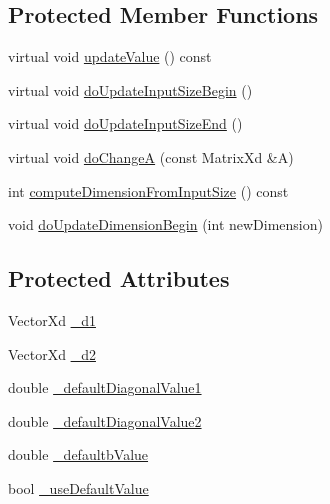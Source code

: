 \subsection*{Protected Member Functions}
\begin{DoxyCompactItemize}
\item 
virtual void \hyperlink{classocra_1_1DoubleDiagonalLinearFunction_a8c400479c04feef1c0b690791f94aff1}{update\+Value} () const 
\item 
virtual void \hyperlink{classocra_1_1DoubleDiagonalLinearFunction_a91fd529bf34bffd327fcd545035bec67}{do\+Update\+Input\+Size\+Begin} ()
\item 
virtual void \hyperlink{classocra_1_1DoubleDiagonalLinearFunction_a89070f8f2b068d8b6b3e216433e50538}{do\+Update\+Input\+Size\+End} ()
\item 
virtual void \hyperlink{classocra_1_1DoubleDiagonalLinearFunction_a55bd813c1f86402eea01bb403c6257bb}{do\+ChangeA} (const Matrix\+Xd \&A)
\item 
int \hyperlink{classocra_1_1DoubleDiagonalLinearFunction_a80f63b937bc48090d02dcb4147870820}{compute\+Dimension\+From\+Input\+Size} () const 
\item 
void \hyperlink{classocra_1_1DoubleDiagonalLinearFunction_af834599e9b414f8778e0618efc552661}{do\+Update\+Dimension\+Begin} (int new\+Dimension)
\end{DoxyCompactItemize}
\subsection*{Protected Attributes}
\begin{DoxyCompactItemize}
\item 
Vector\+Xd \hyperlink{classocra_1_1DoubleDiagonalLinearFunction_aff7e6eb0c3c53e0799909ab76d279d0a}{\+\_\+d1}
\item 
Vector\+Xd \hyperlink{classocra_1_1DoubleDiagonalLinearFunction_a043b9a5dba8b0d42b00deed8898c1843}{\+\_\+d2}
\item 
double \hyperlink{classocra_1_1DoubleDiagonalLinearFunction_a7e4daebabaa357edeb050b1a2e08868f}{\+\_\+default\+Diagonal\+Value1}
\item 
double \hyperlink{classocra_1_1DoubleDiagonalLinearFunction_ac94bc900b6847f9203adcde9d96c20d9}{\+\_\+default\+Diagonal\+Value2}
\item 
double \hyperlink{classocra_1_1DoubleDiagonalLinearFunction_a24ebbdd1093941e346c6931f23d3193f}{\+\_\+defaultb\+Value}
\item 
bool \hyperlink{classocra_1_1DoubleDiagonalLinearFunction_afbb8120fd4b8bda14ee829c78b6cc817}{\+\_\+use\+Default\+Value}
\end{DoxyCompactItemize}
